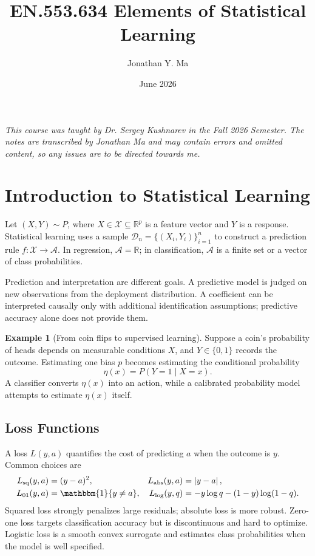 \documentclass[12pt,oneside]{book}
\title{EN.553.634 Elements of Statistical Learning}
\author{Jonathan Y. Ma}
\date{June 2026}
\numberwithin{equation}{section}
\theoremstyle{definition}
\newtheorem{example}{Example}[section]
\theoremstyle{plain}
\theoremstyle{remark}
\newcommand{\R}{\mathbb{R}}
\newcommand{\ind}{\mathbbm{1}}
\newcommand{\abs}[1]{\left\lvert #1 \right\rvert}
\begin{document}
\maketitle

\noindent \emph{This course was taught by Dr. Sergey Kushnarev in the Fall 2026 Semester. The notes are transcribed by Jonathan Ma and may contain errors and omitted content, so any issues are to be directed towards me.}

\tableofcontents

\section{Introduction to Statistical Learning}

Let $(X,Y)\sim P$, where $X\in\mathcal X\subseteq\R^p$ is a feature vector
and $Y$ is a response. Statistical learning uses a sample
$\mathcal D_n=\{(X_i,Y_i)\}_{i=1}^n$ to construct a prediction rule
$f:\mathcal X\to\mathcal A$. In regression, $\mathcal A=\R$; in
classification, $\mathcal A$ is a finite set or a vector of class
probabilities.

Prediction and interpretation are different goals. A predictive model is
judged on new observations from the deployment distribution. A coefficient
can be interpreted causally only with additional identification assumptions;
predictive accuracy alone does not provide them.

\begin{example}[From coin flips to supervised learning]
Suppose a coin's probability of heads depends on measurable conditions $X$,
and $Y\in\{0,1\}$ records the outcome. Estimating one bias $p$ becomes
estimating the conditional probability
\[
    \eta(x)=P(Y=1\mid X=x).
\]
A classifier converts $\eta(x)$ into an action, while a calibrated probability
model attempts to estimate $\eta(x)$ itself.
\end{example}

\subsection{Loss Functions}

A loss $L(y,a)$ quantifies the cost of predicting $a$ when the outcome is
$y$. Common choices are
\begin{align*}
 L_{\mathrm{sq}}(y,a)&=(y-a)^2,&
 L_{\mathrm{abs}}(y,a)&=\abs{y-a},\\
 L_{01}(y,a)&=\ind\{y\neq a\},&
 L_{\mathrm{log}}(y,q)&=-y\log q-(1-y)\log(1-q).
\end{align*}
Squared loss strongly penalizes large residuals; absolute loss is more robust.
Zero-one loss targets classification accuracy but is discontinuous and hard
to optimize. Logistic loss is a smooth convex surrogate and estimates class
probabilities when the model is well specified.
\end{document}
